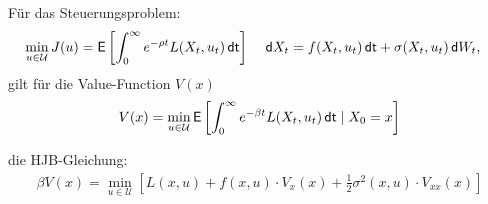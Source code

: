 \documentclass[a4paper, 12pt]{scrartcl}
\newcommand{\dt}{\thinspace \mathsf{dt}}
\newcommand{\dW}{\thinspace \mathsf{d}W}
\newcommand{\dX}{\thinspace \mathsf{d}X}
\begin{document}
\begin{satz}
    Für das Steuerungsproblem:
    \begin{align*}
        \min_{u \in \mathcal{U}} J(u) 
        = \mathsf{E}
        \left[
            \int_0^{\infty} e^{-\rho t} L(X_t, u_t) \dt
        \right]
        \quad
        \dX_t &= f(X_t,u_t) \dt + \sigma(X_t,u_t) \dW_t,
    \end{align*}
    gilt für die Value-Function $V(x)$ 
    \begin{align*}
        V(x) = \min_{u \in \mathcal{U}} 
        \mathsf{E}
        \left[
            \int_0^{\infty} e^{-\beta t} L(X_t, u_t) \dt \mid X_0 = x
        \right]
    \end{align*}
    
    die HJB-Gleichung:
    \begin{align*}
        \beta V(x) = \min_{u \in \mathcal{U}} 
        \left[
            L(x,u) +  f(x,u) \cdot  V_x(x) 
            + \frac{1}{2} \sigma^2(x,u) \cdot V_{xx}(x)
        \right]
    \end{align*}
\end{satz}
\end{document}
